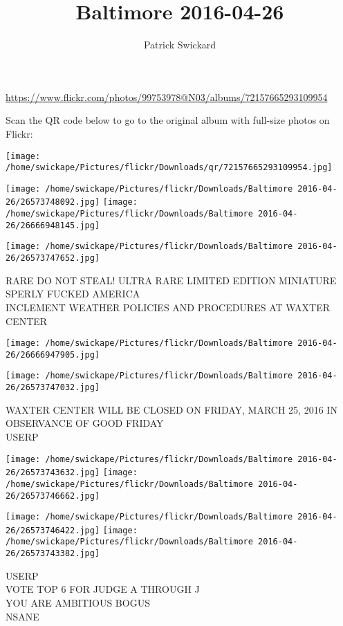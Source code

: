 \documentclass[10pt,letterpaper]{article}
\title{Baltimore 2016-04-26}
\author{Patrick Swickard}
\date{}
\begin{document}
\maketitle

\url{https://www.flickr.com/photos/99753978@N03/albums/72157665293109954}

Scan the QR code below to go to the original album with full-size photos on Flickr:

\texttt{[image: /home/swickape/Pictures/flickr/Downloads/qr/72157665293109954.jpg]}
\pagebreak

\texttt{[image: /home/swickape/Pictures/flickr/Downloads/Baltimore 2016-04-26/26573748092.jpg]}
\texttt{[image: /home/swickape/Pictures/flickr/Downloads/Baltimore 2016-04-26/26666948145.jpg]}

\texttt{[image: /home/swickape/Pictures/flickr/Downloads/Baltimore 2016-04-26/26573747652.jpg]}

RARE DO NOT STEAL!  ULTRA RARE LIMITED EDITION MINIATURE\\
SPERLY FUCKED AMERICA\\
INCLEMENT WEATHER POLICIES AND PROCEDURES AT WAXTER CENTER
\pagebreak

\texttt{[image: /home/swickape/Pictures/flickr/Downloads/Baltimore 2016-04-26/26666947905.jpg]}

\vspace{0.25in}
\texttt{[image: /home/swickape/Pictures/flickr/Downloads/Baltimore 2016-04-26/26573747032.jpg]}

WAXTER CENTER WILL BE CLOSED ON FRIDAY, MARCH 25, 2016 IN OBSERVANCE OF GOOD FRIDAY\\
USERP
\pagebreak

\texttt{[image: /home/swickape/Pictures/flickr/Downloads/Baltimore 2016-04-26/26573743632.jpg]}
\texttt{[image: /home/swickape/Pictures/flickr/Downloads/Baltimore 2016-04-26/26573746662.jpg]}

\texttt{[image: /home/swickape/Pictures/flickr/Downloads/Baltimore 2016-04-26/26573746422.jpg]}
\texttt{[image: /home/swickape/Pictures/flickr/Downloads/Baltimore 2016-04-26/26573743382.jpg]}

USERP\\
VOTE TOP 6 FOR JUDGE A THROUGH J\\
YOU ARE AMBITIOUS BOGUS\\
NSANE
\pagebreak
\end{document}
